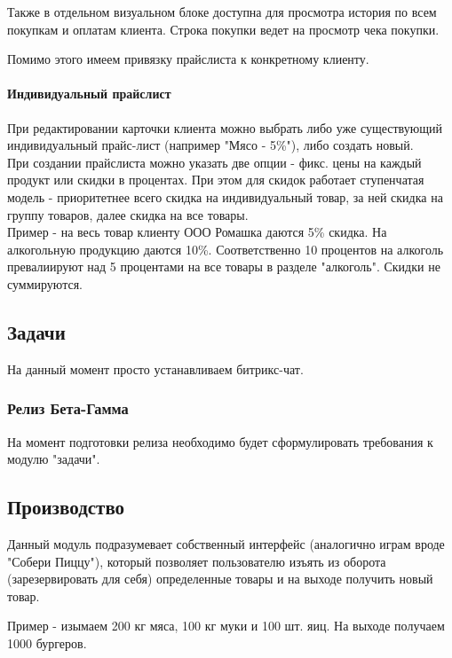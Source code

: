 \documentclass[DIV=calc, paper=a4, fontsize=11pt]{scrartcl} %
\begin{document}
Также в отдельном визуальном блоке доступна для просмотра история по всем покупкам и оплатам клиента. Строка покупки ведет на просмотр чека покупки.  

Помимо этого имеем привязку прайслиста к конкретному клиенту.

\paragraph{Индивидуальный прайслист}

При редактировании карточки клиента можно выбрать либо уже существующий индивидуальный прайс-лист (например "Мясо - 5\%"), либо создать новый.
\\[0.5cm]
При создании прайслиста можно указать две опции - фикс. цены на каждый продукт или скидки в процентах. При этом для скидок работает ступенчатая модель - приоритетнее всего скидка на индивидуальный товар, за ней скидка на группу товаров, далее скидка на все товары.
\\[0.5cm]
Пример - на весь товар клиенту ООО Ромашка даются 5\% скидка. На алкогольную продукцию даются 10\%. Соответственно 10 процентов на алкоголь превалиируют над 5 процентами на все товары в разделе "алкоголь". Скидки не суммируются.

\subsection{Задачи}

На данный момент просто устанавливаем битрикс-чат.

\subsubsection{Релиз Бета-Гамма}
На момент подготовки релиза необходимо будет сформулировать требования к модулю "задачи".

\subsection{Производство}

Данный модуль подразумевает собственный интерфейс (аналогично играм вроде "Собери Пиццу"), который позволяет пользователю изъять из оборота (зарезервировать для себя) определенные товары и на выходе получить новый товар.

Пример - изымаем 200 кг мяса, 100 кг муки и 100 шт. яиц. На выходе получаем 1000 бургеров. 
\end{document}
